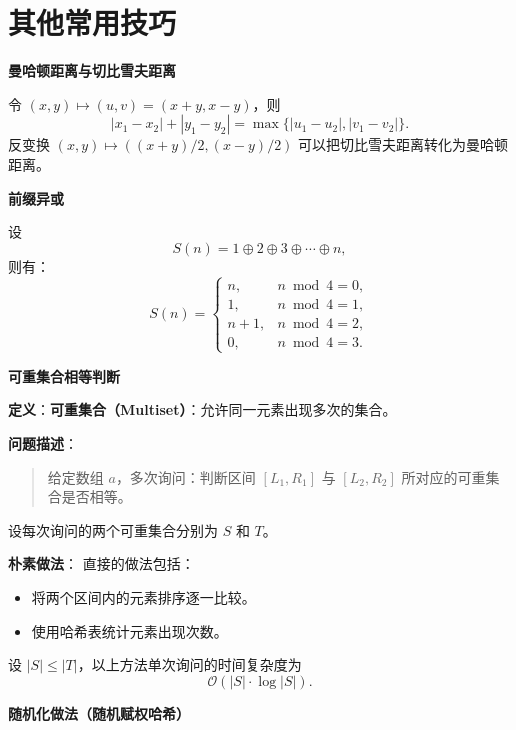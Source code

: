 
\section{其他常用技巧}

\par\medskip\noindent\textbf{曼哈顿距离与切比雪夫距离}\par\smallskip

令 $(x,y)\mapsto(u,v)=(x+y,x-y)$，则
\[
|x_1-x_2|+|y_1-y_2|=\max\{|u_1-u_2|,|v_1-v_2|\}.
\]
反变换 $(x,y)\mapsto((x+y)/2,(x-y)/2)$ 可以把切比雪夫距离转化为曼哈顿距离。

\par\medskip\noindent\textbf{前缀异或}\par\smallskip

设
\[
S(n)=1\oplus 2\oplus 3\oplus \cdots \oplus n,
\]
则有：
\[
S(n)=
\begin{cases}
n, & n \bmod 4 = 0,\\
1, & n \bmod 4 = 1,\\
n+1, & n \bmod 4 = 2,\\
0, & n \bmod 4 = 3.
\end{cases}
\]

\par\medskip\noindent\textbf{可重集合相等判断}\par\smallskip

\textbf{定义}：\textbf{可重集合（Multiset）}：允许同一元素出现多次的集合。

\textbf{问题描述}：
\begin{quote}
给定数组 $a$，多次询问：判断区间 $[L_1,R_1]$ 与 $[L_2,R_2]$ 所对应的可重集合是否相等。
\end{quote}
设每次询问的两个可重集合分别为 $S$ 和 $T$。

\textbf{朴素做法}：
直接的做法包括：
\begin{itemize}
  \item 将两个区间内的元素排序逐一比较。
  \item 使用哈希表统计元素出现次数。
\end{itemize}
设 $|S|\le |T|$，以上方法单次询问的时间复杂度为
\[
\mathcal{O}(|S|\cdot\log|S|).
\]

\textbf{随机化做法（随机赋权哈希）}

